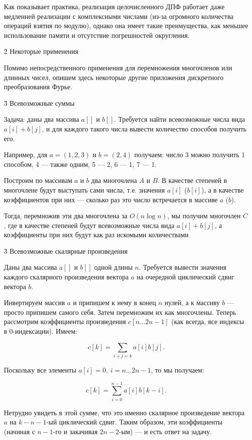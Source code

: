 Как показывает практика, реализация целочисленного ДПФ работает даже медленней реализации с комплексными числами (из-за огромного количества операций взятия по модулю), однако она имеет такие преимущества, как меньшее использование памяти и отсутствие погрешностей округления.


\h2{ Некоторые применения }

Помимо непосредственного применения для перемножения многочленов или длинных чисел, опишем здесь некоторые другие приложения дискретного преобразования Фурье.


\h3{ Всевозможные суммы }

Задача: даны два массива $a[]$ и $b[]$. Требуется найти всевозможные числа вида $a[i]+b[j]$, и для каждого такого числа вывести количество способов получить его.

Например, для $a = (1,2,3)$ и $b = (2,4)$ получаем: число 3 можно получить 1 способом, 4 --- также одним, 5 --- 2, 6 --- 1, 7 --- 1.

Построим по массивам $a$ и $b$ два многочлена $A$ и $B$. В качестве степеней в многочлене будут выступать сами числа, т.е. значения $a[i]$ ($b[i]$), а в качестве коэффициентов при них --- сколько раз это число встречается в массиве $a$ ($b$).

Тогда, перемножив эти два многочлена за $O(n \log n)$, мы получим многочлен $C$, где в качестве степеней будут всевозможные числа вида $a[i]+b[j]$, а коэффициенты при них будут как раз искомыми количествами


\h3{ Всевозможные скалярные произведения }

Даны два массива $a[]$ и $b[]$ одной длины $n$. Требуется вывести значения каждого скалярного произведения вектора $a$ на очередной циклический сдвиг вектора $b$.

Инвертируем массив $a$ и припишем к нему в конец $n$ нулей, а к массиву $b$ --- просто припишем самого себя. Затем перемножим их как многочлены. Теперь рассмотрим коэффициенты произведения $c[n \ldots 2n-1]$ (как всегда, все индексы в 0-индексации). Имеем:

$$ c[k] = \sum_{i+j=k} a[i] b[j]. $$

Поскольку все элементы $a[i]=0,\ i=n \ldots 2n-1$, то мы получаем:

$$ c[k] = \sum_{i=0}^{n-1} a[i] b[k-i]. $$

Нетрудно увидеть в этой сумме, что это именно скалярное произведение вектора $a$ на $k-n-1$-ый циклический сдвиг. Таким образом, эти коэффициенты (начиная с $n-1$-го и закачивая $2n-2$-ым) --- и есть ответ на задачу.

